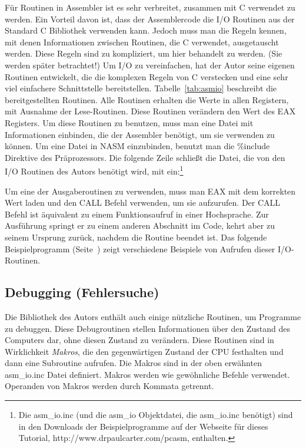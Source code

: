  F\"{u}r Routinen in Assembler ist es sehr
verbreitet, zusammen mit C verwendet zu werden. Ein Vorteil davon
ist, dass der Assemblercode die I/O Routinen aus der Standard C
Bibliothek verwenden kann. Jedoch muss man die Regeln kennen, mit
denen Informationen zwischen Routinen, die C verwendet, ausgetauscht
werden. Diese Regeln sind zu kompliziert, um hier behandelt zu
werden. (Sie werden sp\"{a}ter betrachtet!) Um I/O zu vereinfachen, hat
der Autor seine eigenen Routinen entwickelt, die die komplexen
Regeln von C verstecken und eine sehr viel einfachere Schnittstelle
bereitstellen. Tabelle~\ref{tab:asmio} beschreibt die
bereitgestellten Routinen. Alle Routinen erhalten die Werte in allen
Registern, mit Ausnahme der Lese-Routinen. Diese Routinen ver\"{a}ndern
den Wert des EAX Registers. Um diese Routinen zu benutzen, muss man
eine Datei mit Informationen einbinden, die der Assembler ben\"{o}tigt,
um sie verwenden zu k\"{o}nnen. Um eine Datei in NASM
 einzubinden, benutzt man die {\code
\%include} Direktive des Pr\"{a}prozessors. Die folgende Zeile schlie{\ss}t
die Datei, die von den I/O Routinen des Autors ben\"{o}tigt wird, mit
ein:\footnote{Die {\code asm\_io.inc} (und die {\code asm\_io}
Objektdatei, die {\code asm\_io.inc} ben\"{o}tigt) sind in den Downloads
der Beispielprogramme auf der Webseite f\"{u}r dieses Tutorial, {\code
http://www.drpaulcarter.com/pcasm}, enthalten.}
\begin{AsmCodeListing}[frame=none, numbers=none]
\end{AsmCodeListing}

Um eine der Ausgaberoutinen zu verwenden, muss man EAX mit dem
korrekten Wert laden und den {\code CALL} Befehl verwenden, um sie
aufzurufen. Der {\code CALL} Befehl ist \"{a}quivalent zu einem
Funktionsaufruf in einer Hochsprache. Zur Ausf\"{u}hrung springt er zu
einem anderen Abschnitt im Code, kehrt aber zu seinem Ursprung
zur\"{u}ck, nachdem die Routine beendet ist. Das folgende
Beispielprogramm (Seite~\pageref{line:first.asm0}) zeigt
verschiedene Beispiele von Aufrufen dieser I/O-Routinen.

\subsection{Debugging (Fehlersuche)}

Die Bibliothek des Autors enth\"{a}lt auch einige n\"{u}tzliche Routinen, um
Programme zu debuggen. Diese Debugroutinen stellen Informationen
\"{u}ber den Zustand des Computers dar, ohne diesen Zustand zu
ver\"{a}ndern. Diese Routinen sind in Wirklichkeit \emph{Makros}, die
den gegenw\"{a}rtigen Zustand der CPU festhalten und dann eine
Subroutine aufrufen. Die Makros sind in der oben erw\"{a}hnten {\code
asm\_io.inc} Datei definiert. Makros werden wie gew\"{o}hnliche Befehle
verwendet. Operanden von Makros werden durch Kommata getrennt.

